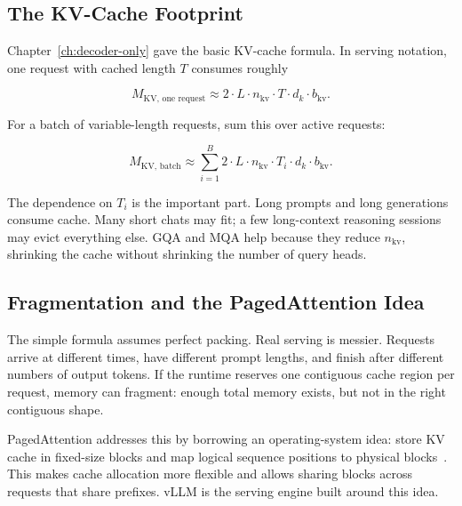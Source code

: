 \subsection{The KV-Cache Footprint}

Chapter~\ref{ch:decoder-only} gave the basic KV-cache formula. In serving notation, one request with cached length $T$ consumes roughly

\begin{equation}
  M_{\text{KV, one request}}
  \approx 2 \cdot L \cdot n_{\text{kv}} \cdot T \cdot d_k \cdot b_{\text{kv}}.
  \label{eq:ch19-kv-memory-one}
\end{equation}

For a batch of variable-length requests, sum this over active requests:

\begin{equation}
  M_{\text{KV, batch}}
  \approx \sum_{i=1}^{B}
  2 \cdot L \cdot n_{\text{kv}} \cdot T_i \cdot d_k \cdot b_{\text{kv}}.
  \label{eq:ch19-kv-memory-batch}
\end{equation}

The dependence on $T_i$ is the important part. Long prompts and long generations consume cache. Many short chats may fit; a few long-context reasoning sessions may evict everything else. GQA and MQA help because they reduce $n_{\text{kv}}$, shrinking the cache without shrinking the number of query heads.

\noindent{}

\subsection{Fragmentation and the PagedAttention Idea}

The simple formula assumes perfect packing. Real serving is messier. Requests arrive at different times, have different prompt lengths, and finish after different numbers of output tokens. If the runtime reserves one contiguous cache region per request, memory can fragment: enough total memory exists, but not in the right contiguous shape.

PagedAttention addresses this by borrowing an operating-system idea: store KV cache in fixed-size blocks and map logical sequence positions to physical blocks~\cite{kwon2023pagedattention}. This makes cache allocation more flexible and allows sharing blocks across requests that share prefixes. vLLM is the serving engine built around this idea.


